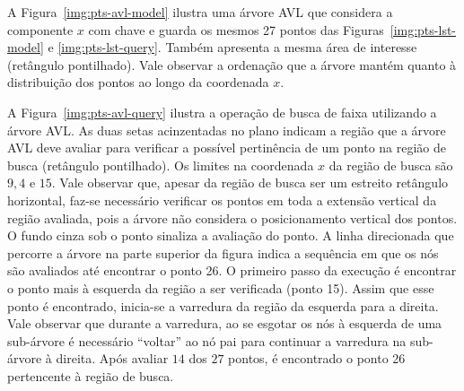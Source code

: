 A Figura~\ref{img:pts-avl-model} ilustra  uma árvore AVL
que considera a componente $x$ com chave e guarda
os mesmos 27 pontos das Figuras~\ref{img:pts-lst-model} e \ref{img:pts-lst-query}.
Também apresenta a mesma área de interesse (retângulo pontilhado).
Vale observar a ordenação que a árvore mantém quanto à distribuição dos pontos
ao longo da coordenada $x$.

A Figura~\ref{img:pts-avl-query} ilustra a operação de busca de faixa utilizando
a árvore AVL.
As duas setas acinzentadas no plano indicam a região que a árvore AVL
deve avaliar para verificar a possível pertinência de um ponto na região de busca
(retângulo pontilhado).
Os limites na coordenada $x$ da região de busca são $9,4$ e $15$.
Vale observar que, apesar da região de busca ser um estreito retângulo horizontal,
faz-se necessário verificar os pontos em toda a extensão vertical da região avaliada,
pois a árvore não considera o posicionamento vertical dos pontos.
O fundo cinza sob o ponto sinaliza a avaliação do ponto.
A linha direcionada que percorre a árvore na parte superior da figura indica
a sequência em que os nós são avaliados até encontrar o ponto 26.
O primeiro passo da execução é encontrar o ponto mais à esquerda da região
a ser verificada (ponto 15).
Assim que esse ponto é encontrado, inicia-se a varredura da
região da esquerda para a direita.
Vale observar que durante a varredura, ao se esgotar os nós à esquerda de uma
sub-árvore é necessário ``voltar'' ao nó pai para continuar a
varredura na sub-árvore à direita.
Após avaliar $14$ dos $27$ pontos, é encontrado o ponto 26 pertencente
à região de busca.


